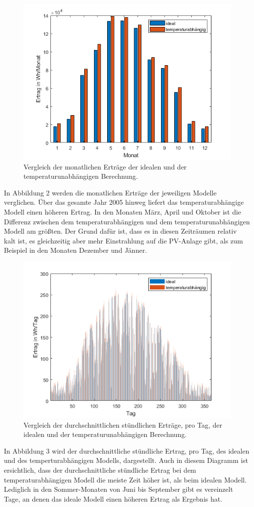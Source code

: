 \documentclass[a4paper,12pt]{article}
\begin{document}
	\begin{figure}[H]
		\centering
		\includegraphics[width=12cm]{img/results/MonatlicheErtraegeVergleich}
		\caption{Vergleich der monatlichen Erträge der idealen und der temperaturunabhängigen Berechnung.}
	\end{figure}
	In Abbildung 2 werden die monatlichen Erträge der jeweiligen Modelle verglichen. Über das gesamte Jahr 2005 hinweg liefert das temperaturabhängige Modell einen höheren Ertrag.\newline
	In den Monaten März, April und Oktober ist die Differenz zwischen dem temperaturabhängigen und dem temperaturunabhängigen Modell am größten. Der Grund dafür ist, dass es in diesen Zeiträumen relativ kalt ist, es gleichzeitig aber mehr Einstrahlung auf die PV-Anlage gibt, als zum Beispiel in den Monaten Dezember und Jänner.
	\begin{figure}[H]
		\centering
		\includegraphics[width=12cm]{img/results/StuendlicheWerteVergleich}
		\caption{Vergleich der durchschnittlichen stündlichen Erträge, pro Tag, der idealen und der temperaturunabhängigen Berechnung.}
	\end{figure}
	In Abbildung 3 wird der durchschnittliche stündliche Ertrag, pro Tag, des idealen und des temperturabhängigen Modells, dargestellt. Auch in diesem Diagramm ist ersichtlich, dass der durchschnittliche stündliche Ertrag bei dem temperaturabhängigen Modell die meiste Zeit höher ist, als beim idealen Modell. Lediglich in den Sommer-Monaten von Juni bis September gibt es vereinzelt Tage, an denen das ideale Modell einen höheren Ertrag als Ergebnis hat.\newpage
\end{document}
